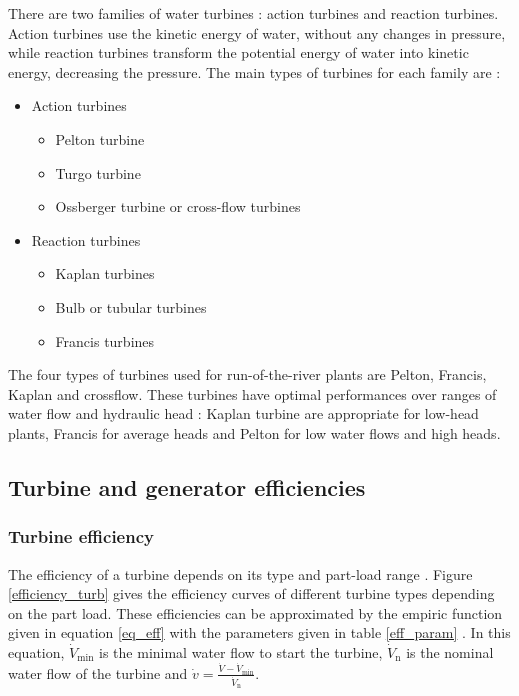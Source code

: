 There are two families of water turbines : action turbines and reaction turbines. Action turbines use the kinetic energy of water, without any changes in pressure, while reaction turbines transform the potential energy of water into kinetic energy, decreasing the pressure. The main types of turbines for each family are \cite{quaschning} :
\begin{itemize}
 \item Action turbines
 \begin{itemize}
  \item Pelton turbine
  \item Turgo turbine
  \item Ossberger turbine or cross-flow turbines
 \end{itemize}
 \item Reaction turbines
 \begin{itemize}
  \item Kaplan turbines
  \item Bulb or tubular turbines
  \item Francis turbines
 \end{itemize}
\end{itemize}

The four types of turbines used for run-of-the-river plants are Pelton, Francis, Kaplan and crossflow. These turbines have optimal performances over ranges of water flow and hydraulic head : Kaplan turbine are appropriate for low-head plants, Francis for average heads and Pelton for low water flows and high heads.   

\subsection{Turbine and generator efficiencies}
\label{eff_turb_gen}

\subsubsection{Turbine efficiency}
The efficiency of a turbine depends on its type and part-load range \cite{quaschning}\cite{pacer}. Figure \ref{efficiency_turb} gives the efficiency curves of different turbine types depending on the part load. These efficiencies can be approximated by the empiric function given in equation \ref{eq_eff} with the parameters given in table \ref{eff_param} \cite{quaschning}. In this equation, $\dot{V}_\mathrm{min}$ is the minimal water flow to start the turbine, $\dot{V}_\mathrm{n}$ is the nominal water flow of the turbine and $\dot{v}=\frac{\dot{V}-\dot{V}_\mathrm{min}}{\dot{V}_\mathrm{n}}$.

